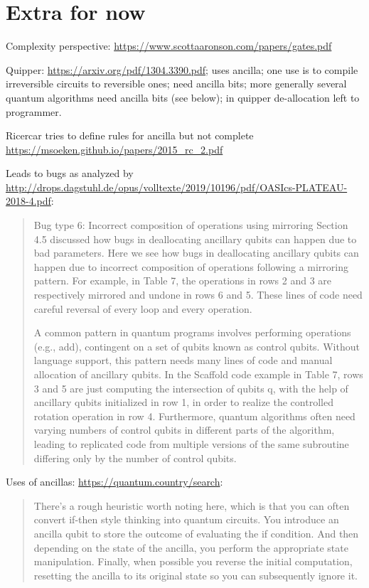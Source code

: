 \documentclass[sigplan,10pt,review,anonymous]{acmart}
\begin{document}
\section{Extra for now}


Complexity perspective: \url{https://www.scottaaronson.com/papers/gates.pdf}

Quipper: \url{https://arxiv.org/pdf/1304.3390.pdf}; uses ancilla; one use is to compile irreversible circuits to reversible ones; need ancilla bits; more generally several quantum algorithms need ancilla bits (see below); in quipper de-allocation left to programmer.

Ricercar tries to define rules for ancilla but not complete \url{https://msoeken.github.io/papers/2015_rc_2.pdf}
 
Leads to bugs as analyzed by \url{http://drops.dagstuhl.de/opus/volltexte/2019/10196/pdf/OASIcs-PLATEAU-2018-4.pdf}:
\begin{quote}

  Bug type 6: Incorrect composition of operations using mirroring Section 4.5 discussed how bugs in deallocating ancillary qubits can happen due to bad parameters. Here we see how bugs in deallocating ancillary qubits can happen due to incorrect composition of operations following a mirroring pattern. For example, in Table 7, the operations in rows 2 and 3 are respectively mirrored and undone in rows 6 and 5. These lines of code need careful reversal of every loop and every operation.

  A common pattern in quantum programs involves performing operations (e.g., add), contingent on a set of qubits known as control qubits. Without language support, this pattern needs many lines of code and manual allocation of ancillary qubits. In the Scaffold code example in Table 7, rows 3 and 5 are just computing the intersection of qubits q, with the help of ancillary qubits initialized in row 1, in order to realize the controlled rotation operation in row 4. Furthermore, quantum algorithms often need varying numbers of control qubits in different parts of the algorithm, leading to replicated code from multiple versions of the same subroutine differing only by the number of control qubits.

\end{quote}

Uses of ancillas:
\url{https://quantum.country/search}:
\begin{quote}
  There’s a rough heuristic worth noting here, which is that you can often convert if-then style thinking into quantum circuits. You introduce an ancilla qubit to store the outcome of evaluating the if condition. And then depending on the state of the ancilla, you perform the appropriate state manipulation. Finally, when possible you reverse the initial computation, resetting the ancilla to its original state so you can subsequently ignore it.
\end{quote}
\end{document}
